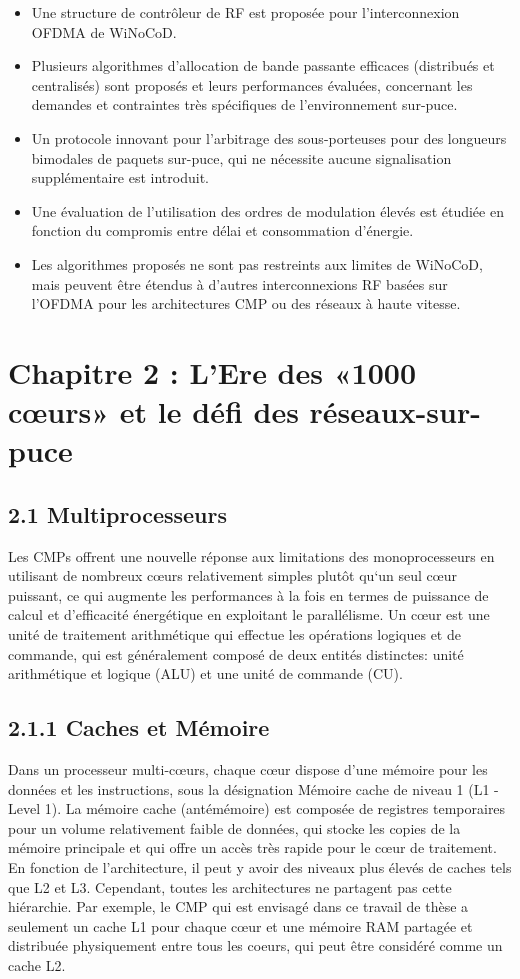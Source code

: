 \begin{itemize}
  \item Une structure de contrôleur de RF est proposée pour l'interconnexion OFDMA de WiNoCoD.
  \item Plusieurs algorithmes d'allocation de bande passante efficaces (distribués et centralisés) sont proposés et leurs performances évaluées, concernant les demandes et contraintes très spécifiques de l'environnement sur-puce.
  \item Un protocole innovant pour l'arbitrage des sous-porteuses pour des longueurs bimodales de paquets sur-puce, qui ne nécessite aucune signalisation supplémentaire est introduit. 
  \item Une évaluation de l’utilisation des ordres de modulation élevés est étudiée en fonction du compromis entre délai et  consommation d'énergie.
  \item Les algorithmes proposés ne sont pas restreints aux limites de WiNoCoD, mais peuvent être étendus à d'autres interconnexions RF basées sur l'OFDMA pour les architectures CMP ou des réseaux à haute vitesse.
\end{itemize}

\section*{Chapitre 2 : L'Ere des «1000 cœurs» et le défi des réseaux-sur-puce}

\subsection*{2.1 Multiprocesseurs}

Les CMPs offrent une nouvelle réponse aux limitations des monoprocesseurs en utilisant de nombreux cœurs relativement simples plutôt qu‘un seul cœur puissant, ce qui augmente les performances à la fois en termes de puissance de calcul et d’efficacité énergétique en exploitant le parallélisme. Un cœur est une unité de traitement arithmétique qui effectue les opérations logiques et de commande, qui est généralement composé de deux entités distinctes: unité arithmétique et logique (ALU) et une unité de commande (CU).

\subsection*{2.1.1 Caches et Mémoire}
Dans un processeur multi-cœurs, chaque cœur dispose d'une mémoire pour les données et les instructions, sous la désignation Mémoire cache de niveau 1 (L1 - Level 1). La mémoire cache (antémémoire) est composée de registres temporaires pour un volume relativement faible de données, qui stocke les copies de la mémoire principale et qui offre un accès très rapide pour le cœur de traitement. En fonction de l'architecture, il peut y avoir des niveaux plus élevés de caches tels que L2 et L3. Cependant, toutes les architectures ne partagent pas cette hiérarchie. Par exemple, le CMP qui est envisagé dans ce travail de thèse a seulement un cache L1 pour chaque cœur et une mémoire RAM partagée et distribuée physiquement entre tous les coeurs, qui peut être considéré comme un cache L2. 

